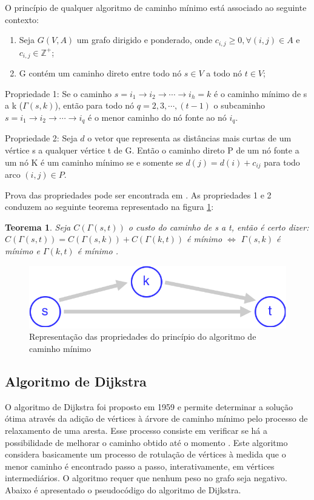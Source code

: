 O princípio de qualquer algoritmo de caminho mínimo está associado ao seguinte contexto:
\begin{enumerate}
  \item Seja $G(V,A)$ um grafo dirigido e ponderado, onde $c_{i,j} \geqslant 0, \forall (i,j) \in A$ e $c_{i,j} \in \mathbb{Z}^+$;
  \item G contém um caminho direto entre todo nó $s \in V$ a todo nó $t \in V$;
\end{enumerate}

Propriedade 1: Se o caminho $s=i_1 \rightarrow i_2 \rightarrow \cdots \rightarrow i_h = k$ é o caminho mínimo de s a k ($\Gamma(s,k)$),
então para todo nó $q = 2,3, \cdots, (t-1)$ o subcaminho $s=i_1 \rightarrow i_2 \rightarrow \cdots \rightarrow i_q$ é o menor caminho
do nó fonte ao nó $i_q$.

Propriedade 2: Seja $d$ o vetor que representa as distâncias mais curtas de um vértice s a qualquer vértice t de G. Então o caminho
direto P de um nó fonte a um nó K é um caminho mínimo se e somente se $d(j) = d(i) + c_{ij}$ para todo arco $(i,j) \in P$.

Prova das propriedades pode ser encontrada em \cite{bookahuja}. As propriedades 1 e 2 conduzem ao seguinte teorema representado na
figura \ref{fig:teorema}:

\newtheorem{meuteorema}{Teorema}[chapter]
\begin{meuteorema} \label{teo:Pita} 
Seja $C(\Gamma(s,t))$ o custo do caminho de s a t, então é certo dizer:
$C(\Gamma(s,t)) = C(\Gamma(s,k)) + C(\Gamma(k,t))$ é mínimo $\Longleftrightarrow$ $\Gamma(s,k)$ é mínimo e $\Gamma(k,t)$ é mínimo . 
\end{meuteorema}

\begin{figure}[htbp]
\centering
 \includegraphics[width=.45\textwidth]{figuras/teorema.png}
\caption{Representação das propriedades do princípio do algoritmo de caminho mínimo}
\label{fig:teorema}
\end{figure}
\FloatBarrier

\subsection{Algoritmo de Dijkstra}
O algoritmo de Dijkstra foi proposto em 1959 e permite determinar a solução ótima através da adição de
vértices à árvore de caminho mínimo pelo processo de relaxamento de uma aresta. Esse processo consiste em verificar
se há a possibilidade de melhorar o caminho obtido até o momento \cite{boaventura}. Este algoritmo considera
basicamente um processo de rotulação de vértices à medida que o menor caminho é encontrado passo a passo,
interativamente, em vértices intermediários. O algoritmo requer que nenhum peso no grafo seja negativo. Abaixo
é apresentado o pseudocódigo do algoritmo de Dijkstra.

